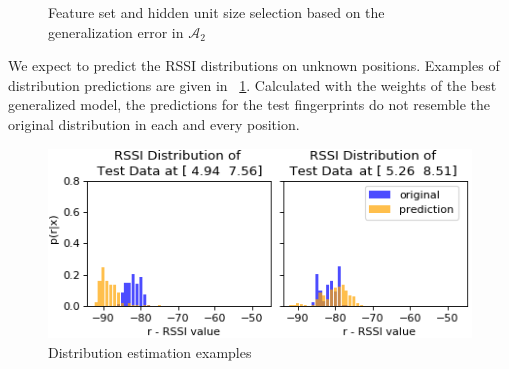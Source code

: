 \documentclass{article}
\begin{document}
	\begin{figure}[h]
		\centering
		\caption{Feature set and hidden unit size selection based on the generalization error in $\mathcal{A}_2$}
	\end{figure}

	We expect to predict the RSSI distributions on unknown positions. Examples of distribution predictions are given in \figurename~\ref{fig:predictions}. Calculated with the weights of the best generalized model, the predictions for the test fingerprints do not resemble the original distribution in each and every position. 
	\begin{figure}[h]
	\centering
	\includegraphics[width=0.8\linewidth]{Pred-Test-3-mini-3}
	\caption{Distribution estimation examples}
	\label{fig:predictions}
	\end{figure} 
\end{document}
